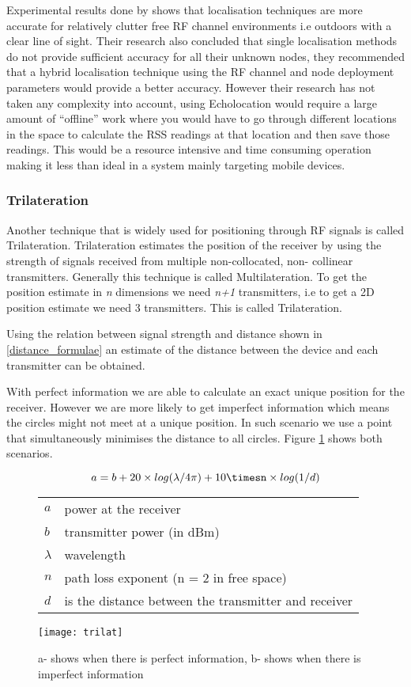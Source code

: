 Experimental results done by \citeauthor{Ecolocation} shows that localisation techniques are more accurate for relatively
clutter free RF channel environments i.e outdoors with a clear line
of sight. Their research also concluded that single localisation
methods do not provide sufficient accuracy for all their unknown
nodes, they recommended that a hybrid localisation technique using the
RF channel and node deployment parameters would provide a better accuracy.
However their research has not taken any complexity into account, using Echolocation
would require a large amount of ``offline'' work where you would
have to go through different locations in the space to calculate the
RSS readings at that location and then save those readings. This would
be a resource intensive and time consuming operation making it less than
ideal in a system mainly targeting mobile devices.


\subsubsection{Trilateration} \label{trilateration_section}
Another technique that is widely used for positioning through RF signals is called Trilateration. Trilateration estimates the position of the receiver by using the strength of signals received from multiple non-collocated, non- collinear transmitters\cite{trilat-characteristics}. Generally this technique is called Multilateration. To get the position estimate in \textit{n} dimensions we need \textit{n+1} transmitters, i.e to get a 2D position estimate we need 3 transmitters. This is called Trilateration.

Using the relation between signal strength and distance shown in \eqref{distance_formulae} an estimate of the distance between the device and each transmitter can be obtained.

With perfect information we are able to calculate an exact unique position for the receiver. However we are more likely to get imperfect information which means the circles might not meet at a unique position. In such scenario we use a point that simultaneously minimises the distance to all circles. Figure \ref{trilat_image} shows both scenarios.
\begin{figure}[H]
\begin{equation} \label{distance_formulae}
\centering
a = b+20\times log(\lambda/4 \pi) + 10\timesn\times log(1/d)
\end{equation}
\begin{tabular}{@{}>{$}l<{$}l@{}}
    a & power at the receiver\\
    b & transmitter power (in dBm)\\
    \lambda &  wavelength\\
    n & path loss exponent (n = 2 in free space)\\
    d & is the distance between the transmitter and receiver
  \end{tabular}
\end{figure}
\begin{figure}[H]
\centering
\texttt{[image: trilat]}
\caption{a- shows when there is perfect information, b- shows when there is imperfect information}
\label{trilat_image}
\end{figure}

